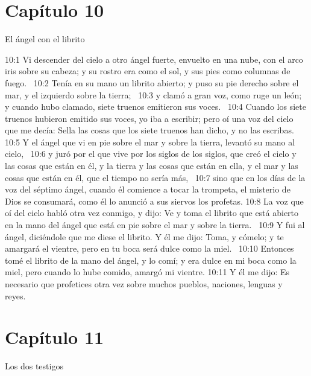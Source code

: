 \section*{Capítulo 10 }
El ángel con el librito  

10:1 Vi descender del cielo a otro ángel fuerte, envuelto en una nube, con el arco iris sobre su cabeza; y su rostro era como el sol, y sus pies como columnas de fuego.  
10:2 Tenía en su mano un librito abierto; y puso su pie derecho sobre el mar, y el izquierdo sobre la tierra;  
10:3 y clamó a gran voz, como ruge un león; y cuando hubo clamado, siete truenos emitieron sus voces.  
10:4 Cuando los siete truenos hubieron emitido sus voces, yo iba a escribir; pero oí una voz del cielo que me decía: Sella las cosas que los siete truenos han dicho, y no las escribas.  
10:5 Y el ángel que vi en pie sobre el mar y sobre la tierra, levantó su mano al cielo,  
10:6 y juró por el que vive por los siglos de los siglos, que creó el cielo y las cosas que están en él, y la tierra y las cosas que están en ella, y el mar y las cosas que están en él, que el tiempo no sería más,  
10:7 sino que en los días de la voz del séptimo ángel, cuando él comience a tocar la trompeta, el misterio de Dios se consumará, como él lo anunció a sus siervos los profetas. 
10:8 La voz que oí del cielo habló otra vez conmigo, y dijo: Ve y toma el librito que está abierto en la mano del ángel que está en pie sobre el mar y sobre la tierra.  
10:9 Y fui al ángel, diciéndole que me diese el librito. Y él me dijo: Toma, y cómelo; y te amargará el vientre, pero en tu boca será dulce como la miel.  
10:10 Entonces tomé el librito de la mano del ángel, y lo comí; y era dulce en mi boca como la miel, pero cuando lo hube comido, amargó mi vientre. 
10:11 Y él me dijo: Es necesario que profetices otra vez sobre muchos pueblos, naciones, lenguas y reyes.  
\section*{Capítulo 11}
Los dos testigos  

